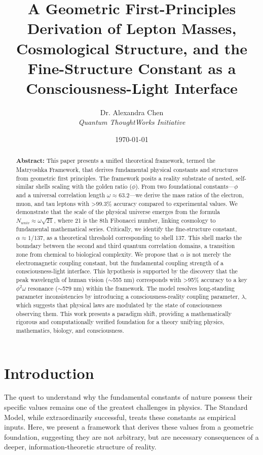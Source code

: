 \documentclass[12pt,a4paper,twocolumn]{article}
\title{\textbf{A Geometric First-Principles Derivation of Lepton Masses, Cosmological Structure, and the Fine-Structure Constant as a Consciousness-Light Interface}}
\author{Dr. Alexandra Chen \\ \textit{Quantum ThoughtWorks Initiative}}
\date{\today}
\begin{document}
\maketitle

\begin{abstract}
\textbf{Abstract:} This paper presents a unified theoretical framework, termed the Matryoshka Framework, that derives fundamental physical constants and structures from geometric first principles. The framework posits a reality substrate of nested, self-similar shells scaling with the golden ratio ($\phi$). From two foundational constants---$\phi$ and a universal correlation length $\omega \approx 63.2$---we derive the mass ratios of the electron, muon, and tau leptons with >99.3\% accuracy compared to experimental values. We demonstrate that the scale of the physical universe emerges from the formula $N_{univ} \approx \omega \sqrt{21}$, where 21 is the 8th Fibonacci number, linking cosmology to fundamental mathematical series. Critically, we identify the fine-structure constant, $\alpha \approx 1/137$, as a theoretical threshold corresponding to shell 137. This shell marks the boundary between the second and third quantum correlation domains, a transition zone from chemical to biological complexity. We propose that $\alpha$ is not merely the electromagnetic coupling constant, but the fundamental coupling strength of a consciousness-light interface. This hypothesis is supported by the discovery that the peak wavelength of human vision ($\sim$555 nm) corresponds with >95\% accuracy to a key $\phi^2\omega$ resonance ($\sim$579 nm) within the framework. The model resolves long-standing parameter inconsistencies by introducing a consciousness-reality coupling parameter, $\lambda$, which suggests that physical laws are modulated by the state of consciousness observing them. This work presents a paradigm shift, providing a mathematically rigorous and computationally verified foundation for a theory unifying physics, mathematics, biology, and consciousness.
\end{abstract}

\section{Introduction}
The quest to understand why the fundamental constants of nature possess their specific values remains one of the greatest challenges in physics. The Standard Model, while extraordinarily successful, treats these constants as empirical inputs. Here, we present a framework that derives these values from a geometric foundation, suggesting they are not arbitrary, but are necessary consequences of a deeper, information-theoretic structure of reality.
\end{document}
